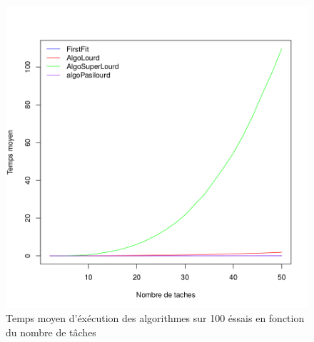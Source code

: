 \documentclass[11pt]{article}
\begin{document}
\begin{figure}[!ht]
    \center
    \includegraphics[scale = 0.4]{temps_moyen}
    \caption{Temps moyen d'éxécution des algorithmes sur 100 éssais en fonction du nombre de tâches}
\end{figure}
\end{document}
